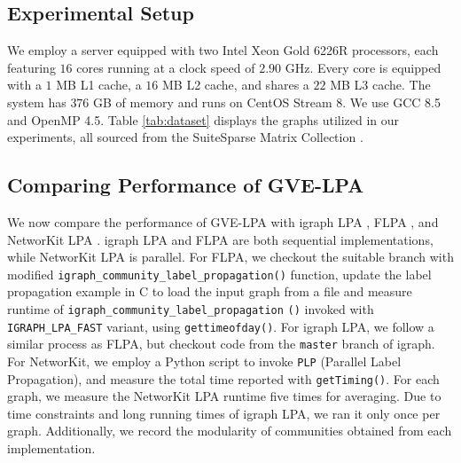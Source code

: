 \subsection{Experimental Setup}
\label{sec:setup}

We employ a server equipped with two Intel Xeon Gold 6226R processors, each featuring $16$ cores running at a clock speed of $2.90$ GHz. Every core is equipped with a $1$ MB L1 cache, a $16$ MB L2 cache, and shares a $22$ MB L3 cache. The system has $376$ GB of memory and runs on CentOS Stream 8. We use GCC 8.5 and OpenMP 4.5. Table \ref{tab:dataset} displays the graphs utilized in our experiments, all sourced from the SuiteSparse Matrix Collection \cite{suite19}.








\subsection{Comparing Performance of GVE-LPA}

We now compare the performance of GVE-LPA with igraph LPA \cite{csardi2006igraph}, FLPA \cite{traag2023large}, and NetworKit LPA \cite{staudt2016networkit}. igraph LPA and FLPA are both sequential implementations, while NetworKit LPA is parallel. For FLPA, we checkout the suitable branch with modified \texttt{igraph\_community\_label\_propagation()} function, update the label propagation example in C to load the input graph from a file and measure runtime of \texttt{igraph\_community\_label\_propagation} \texttt{()} invoked with \texttt{IGRAPH\_LPA\_FAST} variant, using \texttt{gettimeofday()}. For igraph LPA, we follow a similar process as FLPA, but checkout code from the \texttt{master} branch of igraph. For NetworKit, we employ a Python script to invoke \texttt{PLP} (Parallel Label Propagation), and measure the total time reported with \texttt{getTiming()}. For each graph, we measure the NetworKit LPA runtime five times for averaging. Due to time constraints and long running times of igraph LPA, we ran it only once per graph. Additionally, we record the modularity of communities obtained from each implementation.

